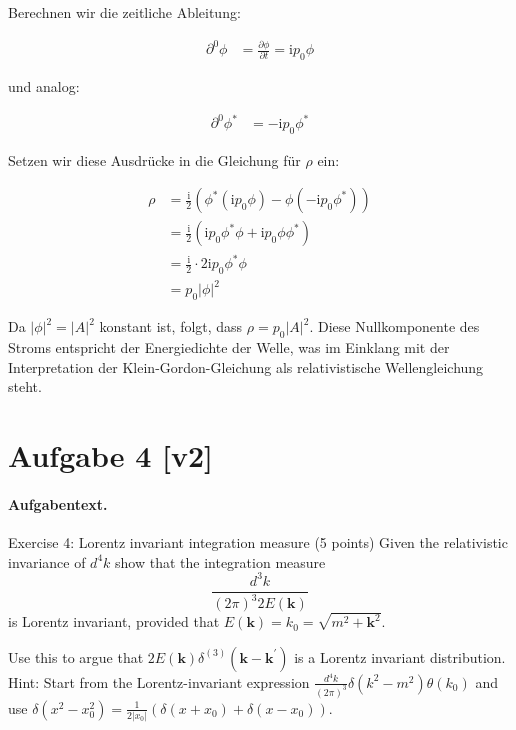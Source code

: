 \documentclass[11pt,a4paper]{article}
\begin{document}
Berechnen wir die zeitliche Ableitung:

\begin{align*}
\partial^0 \phi &= \frac{\partial \phi}{\partial t} = \mathrm{i} p_0 \phi
\end{align*}

und analog:

\begin{align*}
\partial^0 \phi^* &= -\mathrm{i} p_0 \phi^*
\end{align*}

Setzen wir diese Ausdrücke in die Gleichung für $\rho$ ein:

\begin{align*}
\rho &= \frac{\mathrm{i}}{2} \left( \phi^* (\mathrm{i} p_0 \phi) - \phi (-\mathrm{i} p_0 \phi^*) \right) \\
&= \frac{\mathrm{i}}{2} \left( \mathrm{i} p_0 \phi^* \phi + \mathrm{i} p_0 \phi \phi^* \right) \\
&= \frac{\mathrm{i}}{2} \cdot 2 \mathrm{i} p_0 \phi^* \phi \\
&= p_0 |\phi|^2
\end{align*}

Da $|\phi|^2 = |A|^2$ konstant ist, folgt, dass $\rho = p_0 |A|^2$. Diese Nullkomponente des Stroms entspricht der Energiedichte der Welle, was im Einklang mit der Interpretation der Klein-Gordon-Gleichung als relativistische Wellengleichung steht.


\section*{Aufgabe 4 [v2]}
\paragraph{Aufgabentext.}
Exercise 4: Lorentz invariant integration measure (5 points)
Given the relativistic invariance of $d^4 k$ show that the integration measure
$$
\frac{d^3 k}{(2 \pi)^3 2 E(\mathbf{k})}
$$
is Lorentz invariant, provided that $E(\mathbf{k})=k_0=\sqrt{m^2+\mathbf{k}^2}$. 

Use this to argue that $2 E(\mathbf{k}) \delta^{(3)}\left(\mathbf{k}-\mathbf{k}^{\prime}\right)$ is a Lorentz invariant distribution.
Hint: Start from the Lorentz-invariant expression $\frac{d^4 k}{(2 \pi)^3} \delta\left(k^2-m^2\right) \theta\left(k_0\right)$ and use $\delta\left(x^2-x_0^2\right)=\frac{1}{2\left|x_0\right|}\left(\delta\left(x+x_0\right)+\delta\left(x-x_0\right)\right)$.
\end{document}
